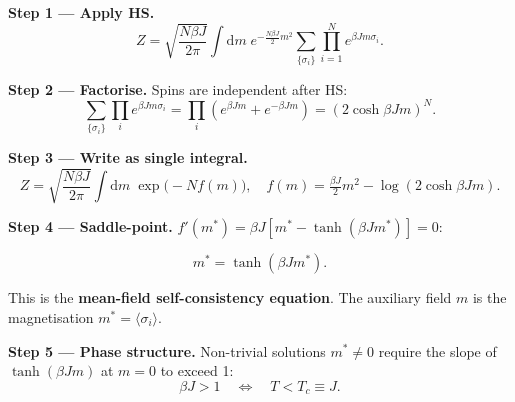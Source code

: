 \documentclass[justified,notoc]{tufte-handout}
\def\d{\mathrm{d}}
\begin{document}
\textbf{Step 1 — Apply HS.}
\begin{equation}
  Z=\sqrt{\frac{N\beta J}{2\pi}}\int\d m\;e^{-\frac{N\beta J}{2}m^2}
    \sum_{\{\sigma_i\}}\prod_{i=1}^N e^{\beta Jm\sigma_i}.
\end{equation}

\textbf{Step 2 — Factorise.} Spins are independent after HS:
\begin{equation}
  \sum_{\{\sigma_i\}}\prod_i e^{\beta Jm\sigma_i}
  =\prod_i(e^{\beta Jm}+e^{-\beta Jm})=(2\cosh\beta Jm)^N.
\end{equation}

\textbf{Step 3 — Write as single integral.}
\begin{equation}
  Z=\sqrt{\frac{N\beta J}{2\pi}}\int\d m\;\exp\!\bigl(-Nf(m)\bigr),
  \quad f(m)=\tfrac{\beta J}{2}m^2-\log(2\cosh\beta Jm).
\end{equation}

\textbf{Step 4 — Saddle-point.} $f'(m^*)=\beta J[m^*-\tanh(\beta Jm^*)]=0$:
\begin{keyresult}
\begin{equation}
  m^*=\tanh(\beta J m^*).
  \label{eq:CW_self_consistency}
\end{equation}
\end{keyresult}
This is the \textbf{mean-field self-consistency equation}. The auxiliary field $m$ is the magnetisation $m^*=\langle\sigma_i\rangle$.

\textbf{Step 5 — Phase structure.} Non-trivial solutions $m^*\neq 0$ require the slope of $\tanh(\beta Jm)$ at $m=0$ to exceed 1:
\begin{equation}
  \beta J>1 \quad\Longleftrightarrow\quad T<T_c\equiv J.
\end{equation}
\end{document}
